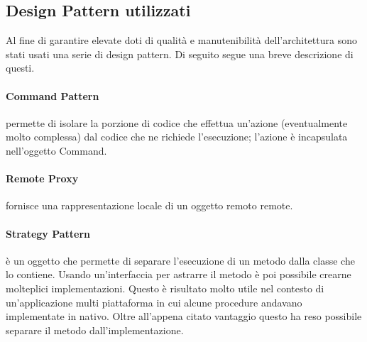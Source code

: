 \begin{namespacedesc}





\end{namespacedesc}


\subsection{Design Pattern utilizzati}
Al fine di garantire elevate doti di qualità e manutenibilità dell’architettura sono stati usati una serie di design pattern. Di seguito segue una breve descrizione di questi.


\paragraph{Command Pattern} permette di isolare la porzione di codice che effettua un'azione (eventualmente molto complessa) dal codice che ne richiede l'esecuzione; l'azione è incapsulata nell'oggetto Command. 
\paragraph{Remote Proxy} fornisce una rappresentazione locale di un oggetto remoto remote. 
\paragraph{Strategy Pattern} è un oggetto che permette di separare l’esecuzione di un metodo dalla classe che lo contiene. Usando un’interfaccia per astrarre il metodo è poi possibile crearne molteplici implementazioni. Questo è risultato molto utile nel contesto di un’applicazione multi piattaforma in cui alcune procedure andavano implementate in nativo. Oltre all’appena citato vantaggio questo ha reso possibile separare il metodo dall’implementazione. 
